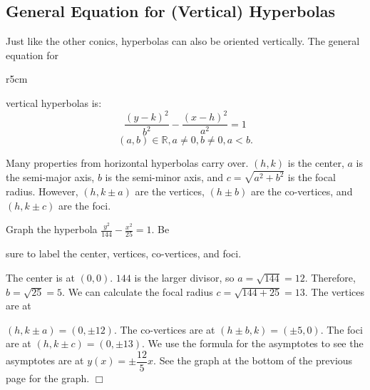 \documentclass[../book.tex]{subfiles}
\begin{document}
\subsection{General Equation for (Vertical) Hyperbolas}
\noindent Just like the other conics, hyperbolas can also be oriented vertically.  The general equation for 

\begin{wrapfigure}{r}{5cm}
\end{wrapfigure}

\noindent vertical hyperbolas is:
$$ \frac{(y-k)^2}{b^2} - \frac{(x-h)^2}{a^2} = 1$$$$(a,b)\in\mathbb{R},a\neq 0,b\neq 0,a<b.$$

Many properties from horizontal hyperbolas carry over.  $(h,k)$ is the center, $a$ is the semi-major axis, $b$ is the semi-minor axis, and $c=\sqrt{a^2+b^2}$ is the focal radius.  However, $(h,k \pm a)$ are the vertices, $(h \pm b)$ are the co-vertices, and $(h,k \pm c)$ are the foci.

\begin{example}
Graph the hyperbola $\frac{y^2}{144} - \frac{x^2}{25} = 1$.  Be 

\noindent sure to label the center, vertices, co-vertices, and foci.
\end{example}

\begin{solution}
The center is at $(0,0)$.  $144$ is the larger divisor, so $a=\sqrt{144}=12$.  Therefore, $b=\sqrt{25}=5$.  We can calculate the focal radius $c=\sqrt{144+25}=13$.  The vertices are at 
\end{solution}

\noindent $(h, k \pm a) = (0,\pm 12)$.  The co-vertices are at $(h\pm b,k)=(\pm 5,0)$.  The foci are at $(h ,k \pm c) = (0, \pm 13)$.  We use the formula for the asymptotes to see the asymptotes are at $y(x)=\pm\dfrac{12}{5}x.$ See the graph at the bottom of the previous page for the graph. $\Box$
\end{document}
